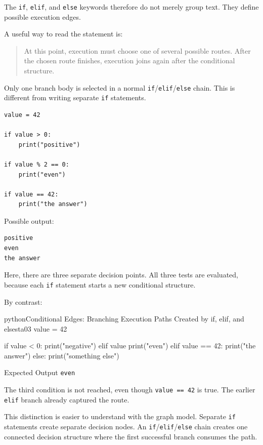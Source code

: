 \documentclass[a4paper,twoside]{report}
\begin{document}
The \texttt{if}, \texttt{elif}, and \texttt{else} keywords therefore do not merely group text. They define possible execution edges.

A useful way to read the statement is:

\begin{quote}
At this point, execution must choose one of several possible routes. After the chosen route finishes, execution joins again after the conditional structure.
\end{quote}

Only one branch body is selected in a normal \texttt{if}/\texttt{elif}/\texttt{else} chain. This is different from writing separate \texttt{if} statements.

\begin{verbatim}
value = 42

if value > 0:
    print("positive")

if value % 2 == 0:
    print("even")

if value == 42:
    print("the answer")
\end{verbatim}

Possible output:

\begin{verbatim}
positive
even
the answer
\end{verbatim}

Here, there are three separate decision points. All three tests are evaluated, because each \texttt{if} statement starts a new conditional structure.

By contrast:

\begin{codebox}[]{python}{Conditional Edges: Branching Execution Paths Created by if, elif, and else}{sta03}
value = 42

if value < 0:
    print("negative")
elif value %
    print("even")
elif value == 42:
    print("the answer")
else:
    print("something else")
\end{codebox}


\begin{iobox}{Expected Output}
\texttt{even} \\
\end{iobox}


The third condition is not reached, even though \texttt{value == 42} is true. The earlier \texttt{elif} branch already captured the route.

This distinction is easier to understand with the graph model. Separate \texttt{if} statements create separate decision nodes. An \texttt{if}/\texttt{elif}/\texttt{else} chain creates one connected decision structure where the first successful branch consumes the path.
\end{document}

